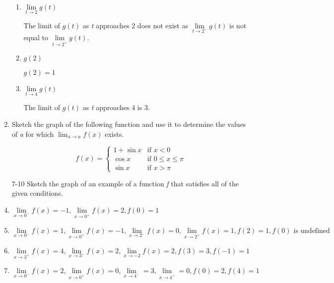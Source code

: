 \documentclass{article}
\begin{document}
\begin{enumerate}
\begin{enumerate}
					\item $\lim \limits_{t \to 2} g(t)$
					
						The limit of $g(t)$ as \emph{t} approaches 2 does not exist as 
						$\lim\limits_{t \to 2^{-}} g(t)$ is not equal to $\lim\limits_{t \to 2^{+}} g(t)$.
						
					\item $g(2)$
					
						$g(2) = 1$
						
					\item $\lim \limits_{t \to 4} g(t)$
					
						The limit of $g(t)$ as \emph{t} approaches 4 is 3.
				\end{enumerate}
				

				\item Sketch the graph of the following function and use it to determine the values of
					\emph{a} for which $\lim_{x \to a} f(x)$ exists.
					
 \begin{displaymath}
   f(x) = \left\{
     \begin{array}{ll}
       1 +\sin x & \text{if } x < 0\\
       \cos x &  \text{if } 0 \leq x \leq \pi \\
       \sin x & \text{if } x > \pi 
     \end{array}
   \right.
\end{displaymath} 

			\item[7-10] Sketch the graph of an example of a function \emph{f} that satisfies all of the 
					given conditions.
					
			\item $\lim \limits_{x \to 0^{-}} f(x) = -1, \lim \limits_{x \to 0^{+}}f(x) = 2, f(0) = 1$
			
			\item $\lim \limits _{x \to 0^{-}} f(x) = 1, \lim \limits _{x \to 0^{+}} f(x) = -1, \lim \limits _{x \to 2^{-}} f(x)=0,
				\lim \limits _{x \to 2^{+}} f(x)  = 1, f(2) = 1, f(0) \text{ is undefined}$
				
			\item $\lim \limits _{x \to 3^{+}} f(x) = 4, \lim \limits _{x \to 3^{-}} f(x) = 2, \lim \limits _{x \to -2} f(x) = 2,
				f(3) = 3, f(-1) = 1$
				
			\item $\lim \limits_{x \to 0^{-}} f(x) = 2, \lim \limits _{x \to 0^{+}} f(x) = 0, \lim \limits _{x \to 4^{-}} = 3,
				\lim \limits _{x \to 4^{+}} = 0, f(0) = 2, f(4) = 1$


\end{enumerate}
\end{document}
